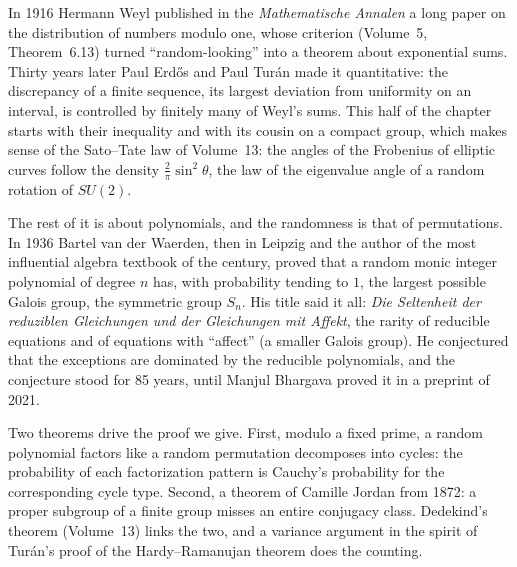 In 1916 Hermann Weyl published in the \emph{Mathematische Annalen} a long paper on the distribution of numbers modulo one, whose criterion (Volume~5, Theorem~6.13) turned ``random-looking'' into a theorem about exponential sums. Thirty years later Paul Erd\H{o}s and Paul Turán made it quantitative: the discrepancy of a finite sequence, its largest deviation from uniformity on an interval, is controlled by finitely many of Weyl's sums. This half of the chapter starts with their inequality and with its cousin on a compact group, which makes sense of the Sato--Tate law of Volume~13: the angles of the Frobenius of elliptic curves follow the density $\frac2\pi\sin^2\theta$, the law of the eigenvalue angle of a random rotation of $SU(2)$.

The rest of it is about polynomials, and the randomness is that of permutations. In 1936 Bartel van der Waerden, then in Leipzig and the author of the most influential algebra textbook of the century, proved that a random monic integer polynomial of degree $n$ has, with probability tending to $1$, the largest possible Galois group, the symmetric group $S_n$. His title said it all: \emph{Die Seltenheit der reduziblen Gleichungen und der Gleichungen mit Affekt}, the rarity of reducible equations and of equations with ``affect'' (a smaller Galois group). He conjectured that the exceptions are dominated by the reducible polynomials, and the conjecture stood for 85 years, until Manjul Bhargava proved it in a preprint of 2021.

Two theorems drive the proof we give. First, modulo a fixed prime, a random polynomial factors like a random permutation decomposes into cycles: the probability of each factorization pattern is Cauchy's probability for the corresponding cycle type. Second, a theorem of Camille Jordan from 1872: a proper subgroup of a finite group misses an entire conjugacy class. Dedekind's theorem (Volume~13) links the two, and a variance argument in the spirit of Turán's proof of the Hardy--Ramanujan theorem does the counting.

